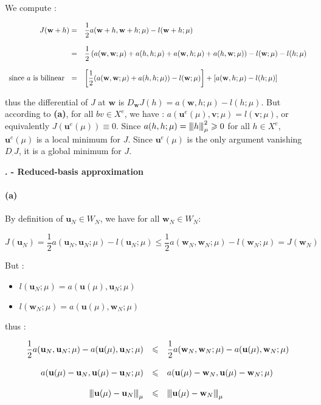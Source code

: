 \documentclass[a4paper]{article}
\newcounter{c}
\newcounter{d}
\newcounter{r}
\newcounter{e}
\newcounter{sujet}
\newcommand{\chapitre}[1]{\stepcounter{c}\setcounter{e}{0}\setcounter{d}{0}\setcounter{r}{0}\bigskip\noindent\textbf{\Large\arabic{sujet}.\Roman{c} - #1}\\}
\newcommand{\vertiii}[1]{{\left\vert\kern-0.25ex\left\vert\kern-0.25ex\left\vert #1 
    \right\vert\kern-0.25ex\right\vert\kern-0.25ex\right\vert}}
\newcommand{\bu}{\mathbf u}
\newcommand{\bv}{\mathbf v}
\newcommand{\bw}{\mathbf w}
\begin{document}
We compute :

$$\begin{array}{rl}
J(\bw+h)=&\displaystyle\frac12a(\bw+h,\bw+h;\mu)-l(\bw+h;\mu)\\
&\\
=&\displaystyle\frac12\left(a(\bw,\bw;\mu)+a(h,h;\mu)+a(\bw,h;\mu)+a(h,\bw;\mu)\right)-l(\bw;\mu)-l(h;\mu)\\
&\\
\text{since $a$ is bilinear  }~\hfill=&\displaystyle\left[\frac12(a(\bw,\bw;\mu)+a(h,h;\mu))-l(\bw;\mu)\right]+\left[a(\bw,h;\mu)-l(h;\mu)\right]\\
\end{array}$$

thus the differential of $J$ at $\bw$ is $D_\bw J(h)=a(\bw,h;\mu)-l(h;\mu)$. But according to \textbf{(a)}, for all $bv\in X^e$, we have : $a(\bu^e(\mu),\bv;\mu)=l(\bv;\mu)$, or equivalently $J(\bu^e(\mu))\equiv0$. Since $a(h,h;\mu)=\vertiii h_\mu^2\geqslant0$ for all $h\in X^e$, $\bu^e(\mu)$ is a local minimum for $J$. Since $\bu^e(\mu)$ is the only argument vanishing $D_\cdot J$, it is a global minimum for $J$.

\chapitre{Reduced-basis approximation}

\paragraph{(a)}By definition of $\bu_N\in W_N$, we have for all $\bw_N\in W_N$:

$$J(\bu_N)=\frac12a(\bu_N,\bu_N;\mu)-l(\bu_N;\mu)\leqslant\frac12a(\bw_N,\bw_N;\mu)-l(\bw_N;\mu)=J(\bw_N)$$

But :
\begin{itemize}
\item$l(\bu_N;\mu)=a(\bu(\mu),\bu_N;\mu)$
\item$l(\bw_N;\mu)=a(\bu(\mu),\bw_N;\mu)$
\end{itemize}

thus :

$$\begin{array}{rcl}
\displaystyle\frac12a(\bu_N,\bu_N;\mu)-a(\bu(\mu),\bu_N;\mu)&\leqslant&\displaystyle\frac12a(\bw_N,\bw_N;\mu)-a(\bu(\mu),\bw_N;\mu)\\
&&\\
a(\bu(\mu)-\bu_N,\bu(\mu)-\bu_N;\mu)&\leqslant&a(\bu(\mu)-\bw_N,\bu(\mu)-\bw_N;\mu)\\
&&\\
\vertiii{\bu(\mu)-\bu_N}_\mu&\leqslant&\vertiii{\bu(\mu)-\bw_N}_\mu
\end{array}$$
\end{document}
